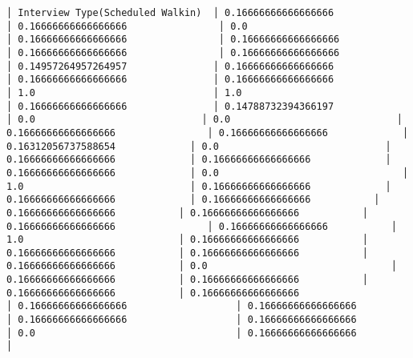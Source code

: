 \documentclass[11pt]{article}
\begin{document}
\begin{Verbatim}[commandchars=\\\{\}]
│ Interview Type(Scheduled Walkin)  │ 0.16666666666666666                │ 0.16666666666666666                │ 0.0                                │ 0.16666666666666666                │ 0.16666666666666666                │ 0.16666666666666666                │ 0.16666666666666666                │ 0.14957264957264957               │ 0.16666666666666666               │ 0.16666666666666666               │ 0.16666666666666666                │ 1.0                               │ 1.0                               │ 0.16666666666666666               │ 0.14788732394366197             │ 0.0                             │ 0.0                             │ 0.16666666666666666                │ 0.16666666666666666             │ 0.16312056737588654             │ 0.0                             │ 0.16666666666666666             │ 0.16666666666666666             │ 0.16666666666666666             │ 0.0                                │ 1.0                             │ 0.16666666666666666             │ 0.16666666666666666             │ 0.16666666666666666           │ 0.16666666666666666           │ 0.16666666666666666           │ 0.16666666666666666                │ 0.16666666666666666           │ 1.0                           │ 0.16666666666666666           │ 0.16666666666666666           │ 0.16666666666666666           │ 0.16666666666666666           │ 0.0                                │ 0.16666666666666666           │ 0.16666666666666666           │ 0.16666666666666666           │ 0.16666666666666666                   │ 0.16666666666666666                   │ 0.16666666666666666                   │ 0.16666666666666666                   │ 0.16666666666666666                   │ 0.0                                   │ 0.16666666666666666                   │

\end{Verbatim}
\end{document}

